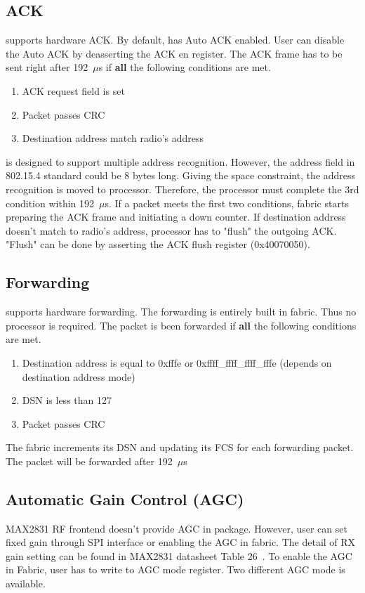 \subsection{ACK}
\sdr supports hardware ACK. By default, \sdr has Auto ACK enabled. User can disable the Auto ACK by
deasserting the ACK en register. The ACK frame has to be sent right after 192~$\mu$s if {\bf all} the 
following conditions are met.
\begin{enumerate}
	\item ACK request field is set
	\item Packet passes CRC
	\item Destination address match radio's address
\end{enumerate}
\sdr is designed to support multiple address recognition. However, the address field in 802.15.4
standard could be 8 bytes long. Giving the space constraint, the address recognition is moved to
processor. Therefore, the processor must complete the 3rd condition within 192~$\mu$s. If a
packet meets the first two conditions, fabric starts preparing the ACK frame and initiating a
down counter. If destination address doesn't match to radio's address, processor has to "flush"
the outgoing ACK. "Flush" can be done by asserting the ACK flush register (0x40070050).

\subsection{Forwarding}
\sdr supports hardware forwarding. The forwarding is entirely built in fabric. Thus no processor
is required. The packet is been forwarded if {\bf all} the following conditions are met.
\begin{enumerate}
	\item Destination address is equal to 0xfffe or 0xffff\_ffff\_ffff\_fffe (depends on destination 
	address mode)
	\item DSN is less than 127
	\item Packet passes CRC
\end{enumerate}
The fabric increments its DSN and updating its FCS for each forwarding packet. The packet will be
forwarded after 192~$\mu$s

\subsection{Automatic Gain Control (AGC)}
MAX2831 RF frontend doesn't provide AGC in package. However, user can set fixed gain through SPI
interface or enabling the AGC in fabric. The detail of RX gain setting can be found in MAX2831
datasheet Table 26~\cite{MAX2831}. To enable the AGC in Fabric, user has to write to AGC mode 
register. Two different AGC mode is available.

